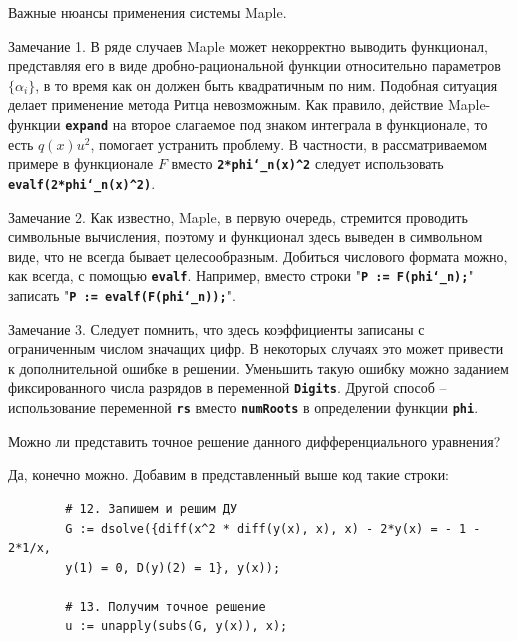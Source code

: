 \begin{warn}[ВНИМАНИЕ!]
	Важные нюансы применения системы Maple.
	
	Замечание 1. В ряде случаев Maple может некорректно выводить функционал, представляя его в виде дробно-рациональной функции относительно параметров $\{\alpha_{i}\}$, в то время как он должен быть квадратичным по ним. Подобная ситуация делает применение метода Ритца невозможным. Как правило, действие Maple-функции \textbf{\texttt{expand}} на второе слагаемое под знаком интеграла в функционале, то есть $q(x)u^{2}$, помогает устранить проблему. В частности, в рассматриваемом примере в функционале $F$ вместо \textbf{\texttt{2*phi\char`_n(x)\^{}2}} следует использовать \textbf{\texttt{evalf(2*phi\char`_n(x)\^{}2)}}.
	
	Замечание 2. Как известно, Maple, в первую очередь, стремится проводить символьные вычисления, поэтому и функционал здесь выведен в символьном виде, что не всегда бывает целесообразным. Добиться числового формата можно, как всегда, с помощью \textbf{\texttt{evalf}}. Например, вместо строки "\textbf{\texttt{P := F(phi\char`_n);}}" \; записать \; "\textbf{\texttt{P := evalf(F(phi\char`_n));}}".
	
	Замечание 3. Следует помнить, что здесь коэффициенты записаны с ограниченным числом значащих цифр. В некоторых случаях это может привести к дополнительной ошибке в решении. Уменьшить такую ошибку можно заданием фиксированного числа разрядов в переменной \textbf{\texttt{Digits}}. Другой способ -- использование переменной \textbf{\texttt{rs}} вместо \textbf{\texttt{numRoots}} в определении функции \textbf{\texttt{phi}}.
\end{warn}

\begin{question}
	Можно ли представить точное решение данного дифференциального уравнения?
\end{question}

Да, конечно можно. Добавим в представленный выше код такие строки:

\begin{commandline}
	\begin{verbatim}
		# 12. Запишем и решим ДУ
		G := dsolve({diff(x^2 * diff(y(x), x), x) - 2*y(x) = - 1 - 2*1/x,
		y(1) = 0, D(y)(2) = 1}, y(x));
		
		# 13. Получим точное решение
		u := unapply(subs(G, y(x)), x);
	\end{verbatim}
\end{commandline}


